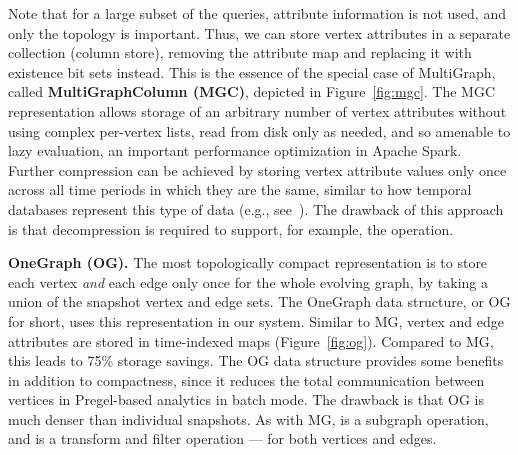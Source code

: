Note that for a large subset of the queries, attribute information is
not used, and only the topology is important.  Thus, we can store
vertex attributes in a separate collection (column store), removing
the attribute map and replacing it with existence bit sets instead.
This is the essence of the special case of MultiGraph, called {\bf
  MultiGraphColumn (MGC)}, depicted in Figure~\ref{fig:mgc}.  The MGC
representation allows storage of an arbitrary number of vertex
attributes without using complex per-vertex lists, read from disk only
as needed, and so amenable to lazy evaluation, an important
performance optimization in Apache Spark.  Further compression can be
achieved by storing vertex attribute values only once across all time
periods in which they are the same, similar to how temporal databases
represent this type of data (e.g., see~\cite{Muller2008}).  The
drawback of this approach is that decompression is required to
support, for example, the  operation.


{\bf OneGraph (OG).}  The most topologically compact representation is
to store each vertex {\em and} each edge only once for the whole
evolving graph, by taking a union of the snapshot vertex and edge
sets.  The OneGraph data structure, or OG for short, uses this
representation in our system.  Similar to MG, vertex and edge
attributes are stored in time-indexed maps (Figure~\ref{fig:og}).
Compared to MG, this leads to 75\% storage savings.  The OG data
structure provides some benefits in addition to compactness, since it
reduces the total communication between vertices in Pregel-based
analytics in batch mode.  The drawback is that OG is much denser than
individual snapshots.  As with MG,  is a subgraph
operation, and  is a transform and filter operation ---
for both vertices and edges.

